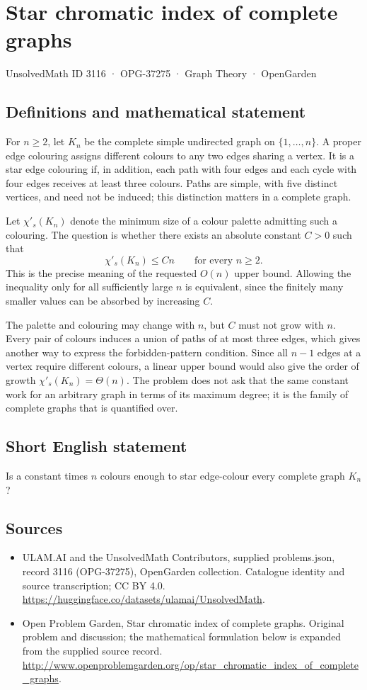 \documentclass[11pt,a4paper]{article}
\begin{document}
\section*{Star chromatic index of complete graphs}\label{3116}
{\small UnsolvedMath ID 3116 · OPG-37275 · Graph Theory · OpenGarden}
\subsection{Definitions and mathematical statement}
For $n\ge2$, let $K_n$ be the complete simple undirected graph on
$\{1,\ldots,n\}$. A proper edge colouring assigns different colours to
any two edges sharing a vertex. It is a star edge colouring if, in
addition, each path with four edges and each cycle with four edges
receives at least three colours. Paths are simple, with five distinct
vertices, and need not be induced; this distinction matters in a
complete graph.

Let $\chi'_s(K_n)$ denote the minimum size of a colour palette admitting
such a colouring. The question is whether there exists an absolute
constant $C>0$ such that
\[
 \chi'_s(K_n)\le Cn\qquad\text{for every }n\ge2.
\]
This is the precise meaning of the requested $O(n)$ upper bound.
Allowing the inequality only for all sufficiently large $n$ is equivalent,
since the finitely many smaller values can be absorbed by increasing $C$.

The palette and colouring may change with $n$, but $C$ must not grow
with $n$. Every pair of colours induces a union of paths of at most
three edges, which gives another way to express the forbidden-pattern
condition. Since all $n-1$ edges at a vertex require different colours,
a linear upper bound would also give the order of growth
$\chi'_s(K_n)=\Theta(n)$.
The problem does not ask that the same constant work for an arbitrary
graph in terms of its maximum degree; it is the family of complete
graphs that is quantified over.
\subsection{Short English statement}
Is a constant times $n$ colours enough to star edge-colour every complete graph $K_n$?
\subsection{Sources}
\begin{itemize}
\item[S1] ULAM.AI and the UnsolvedMath Contributors, supplied problems.json, record 3116 (OPG-37275), OpenGarden collection. Catalogue identity and source transcription; CC BY 4.0.
\url{https://huggingface.co/datasets/ulamai/UnsolvedMath}.
\item[S2] Open Problem Garden, Star chromatic index of complete graphs. Original problem and discussion; the mathematical formulation below is expanded from the supplied source record.
\url{http://www.openproblemgarden.org/op/star_chromatic_index_of_complete_graphs}.
\end{itemize}
\end{document}
